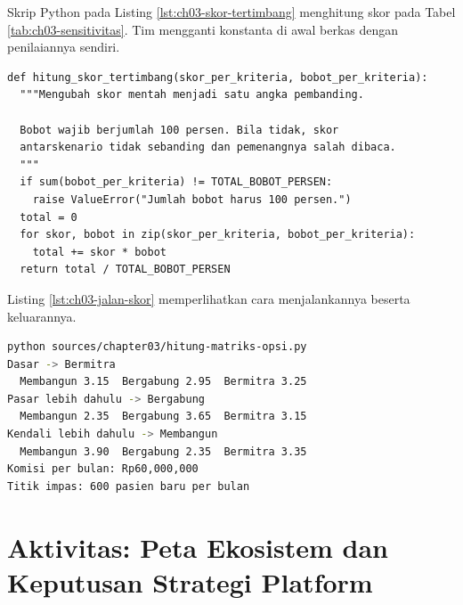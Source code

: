 
\begin{pendalaman}[title={Pendalaman Teknis (opsional): Menguji Kepekaan Bobot}]
Skrip Python pada Listing \ref{lst:ch03-skor-tertimbang} menghitung skor pada Tabel
\ref{tab:ch03-sensitivitas}. Tim mengganti konstanta di awal berkas dengan penilaiannya sendiri.

\begin{lstlisting}[style=ch03python, caption={Skor tertimbang, tersedia di \berkas{sources/chapter03/hitung-matriks-opsi.py}}, label={lst:ch03-skor-tertimbang}]
def hitung_skor_tertimbang(skor_per_kriteria, bobot_per_kriteria):
  """Mengubah skor mentah menjadi satu angka pembanding.

  Bobot wajib berjumlah 100 persen. Bila tidak, skor
  antarskenario tidak sebanding dan pemenangnya salah dibaca.
  """
  if sum(bobot_per_kriteria) != TOTAL_BOBOT_PERSEN:
    raise ValueError("Jumlah bobot harus 100 persen.")
  total = 0
  for skor, bobot in zip(skor_per_kriteria, bobot_per_kriteria):
    total += skor * bobot
  return total / TOTAL_BOBOT_PERSEN
\end{lstlisting}

Listing \ref{lst:ch03-jalan-skor} memperlihatkan cara menjalankannya beserta keluarannya.

\begin{lstlisting}[language=bash, xleftmargin=8pt, caption={Menjalankan perhitungan, memakai \berkas{sources/chapter03/hitung-matriks-opsi.py}}, label={lst:ch03-jalan-skor}]
python sources/chapter03/hitung-matriks-opsi.py
Dasar -> Bermitra
  Membangun 3.15  Bergabung 2.95  Bermitra 3.25
Pasar lebih dahulu -> Bergabung
  Membangun 2.35  Bergabung 3.65  Bermitra 3.15
Kendali lebih dahulu -> Membangun
  Membangun 3.90  Bergabung 2.35  Bermitra 3.35
Komisi per bulan: Rp60,000,000
Titik impas: 600 pasien baru per bulan
\end{lstlisting}
\end{pendalaman}

\section{Aktivitas: Peta Ekosistem dan Keputusan Strategi Platform}

